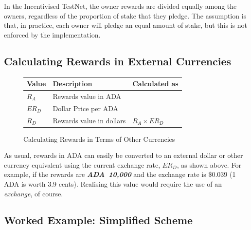 \documentclass[11pt,a4paper,dvipsnames,twosided,final]{article}
\newcommand{\ada}{ADA{}}
\newcommand{\ADA}[1]{\textbf{\emph{\ada~{#1}}}}
\begin{document}
\noindent
In the Incentivised TestNet, the owner rewards are divided equally among the
owners, regardless of the proportion of stake that they pledge.  The assumption
is that, in practice, each owner will pledge an equal amount of stake, but this
is not enforced by the implementation.

\subsection{Calculating Rewards in External Currencies}
\label{sec:conversion}

\begin{figure}[h!]
\begin{center}
\begin{tabular}{||l|p{6cm}|l||}
  \hline \hline
\textbf{Value} & \textbf{Description} & \textbf{Calculated as} \\\hline
$R_A$ &  Rewards value in \ada{} &\\\hline
$ER_D$ &  Dollar Price per \ada{} &\\\hline
$R_D$ &  Rewards value in dollars & $R_A \times ER_D$ \\\hline
\hline
\end{tabular}
\end{center}
\caption{Calculating Rewards in Terms of Other Currencies}
\label{fig:monetary}
\end{figure}

\noindent
As usual, rewards in \ada{} can easily be converted to an external dollar or other currency equivalent using
the current exchange rate, $ER_D$, as shown %
above.  For example, if the rewards are \ADA{10,000} and the exchange rate is
\$0.039 (1 \ada{} is worth 3.9 cents).  Realising this value would require the use of an \emph{exchange},
of course.

\clearpage
\subsection{Worked Example: Simplified Scheme}
\end{document}
